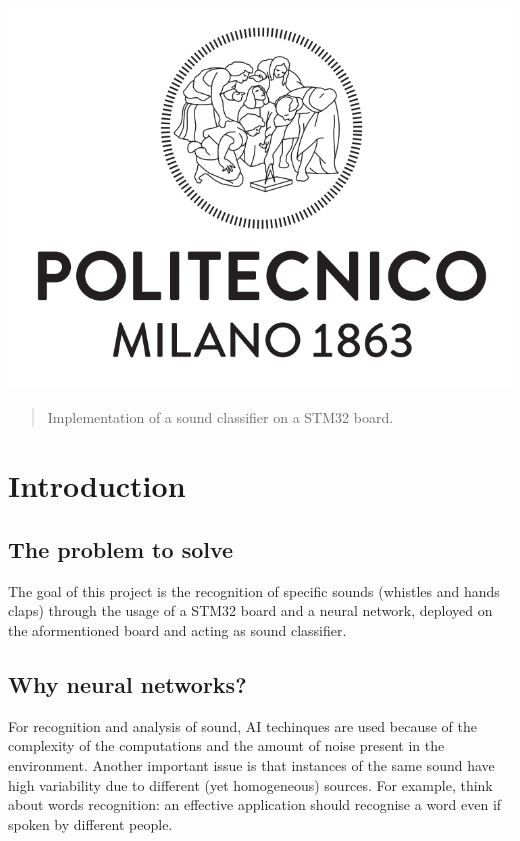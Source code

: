 \documentclass[12pt]{article}
\begin{document}
\begin{titlepage}
\begin{center}
	\includegraphics[scale=0.23]{img/Logo_Politecnico_Milano.png}                                               
\end{center}

\vfill

\end{titlepage}


\begin{abstract}
Implementation of a sound classifier on a STM32 board.
\end{abstract}

\section{Introduction}

\subsection{The problem to solve}
The goal of this project is the recognition of specific sounds (whistles and hands claps) through the usage of a STM32 board and a neural network, deployed on the aformentioned board and acting as sound classifier.

\subsection{Why neural networks?}
For recognition and analysis of sound, AI techinques are used because of the complexity of the computations and the amount of noise present in the environment. Another important issue is that instances of the same sound have high variability due to different (yet homogeneous) sources. For example, think about words recognition: an effective application should recognise a word even if spoken by different people.
\end{document}
